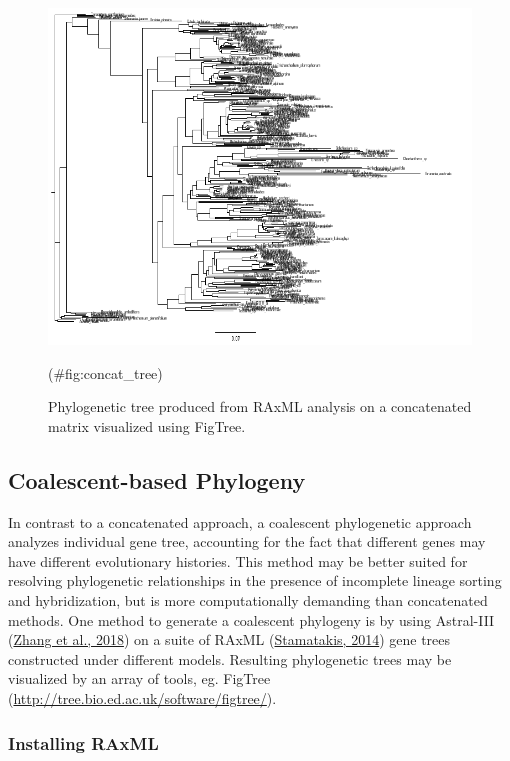 \documentclass[
  12pt,
]{article}
\begin{document}
\begin{figure}
\includegraphics[width=1\linewidth]{Images/concat.raxml} \caption{Phylogenetic tree produced from RAxML analysis on a concatenated matrix visualized using FigTree.}(\#fig:concat_tree)
\end{figure}

\hypertarget{coalescent-based-phylogeny}{%
\subsection{Coalescent-based Phylogeny}\label{coalescent-based-phylogeny}}

In contrast to a concatenated approach, a coalescent phylogenetic approach analyzes individual gene tree, accounting for the fact that different genes may have different evolutionary histories. This method may be better suited for resolving phylogenetic relationships in the presence of incomplete lineage sorting and hybridization, but is more computationally demanding than concatenated methods. One method to generate a coalescent phylogeny is by using Astral-III (\protect\hyperlink{ref-Zhang2018}{Zhang et al., 2018}) on a suite of RAxML (\protect\hyperlink{ref-Stamatakis2014}{Stamatakis, 2014}) gene trees constructed under different models. Resulting phylogenetic trees may be visualized by an array of tools, eg. FigTree (\url{http://tree.bio.ed.ac.uk/software/figtree/}).

\hypertarget{installing-raxml-1}{%
\subsubsection{Installing RAxML}\label{installing-raxml-1}}
\end{document}
